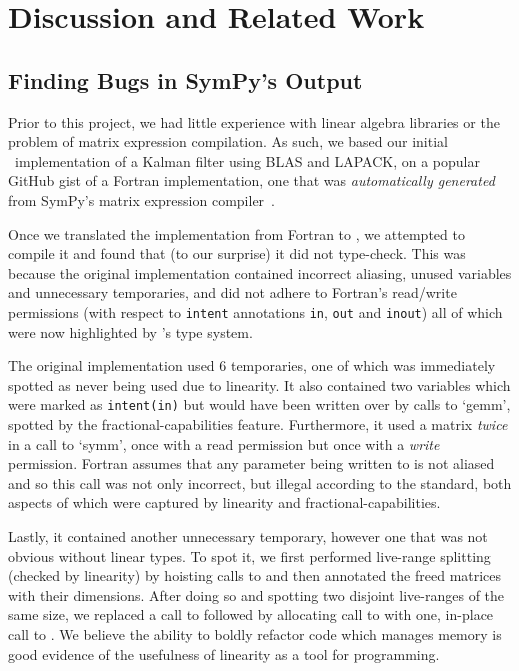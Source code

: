 \section{Discussion and Related Work}\label{sec:discussion_related_work}

\subsection{Finding Bugs in SymPy's Output}

Prior to this project, we had little experience with linear algebra libraries
or the problem of matrix expression compilation. As such, we based our initial
\lang\ implementation of a Kalman filter using BLAS and LAPACK, on a popular
GitHub gist of a Fortran implementation, one that was \emph{automatically
generated} from SymPy's matrix expression compiler~\cite{rocklin_thesis}.

Once we translated the implementation from Fortran to \lang, we attempted to
compile it and found that (to our surprise) it did not type-check. This was
because the original implementation contained incorrect aliasing, unused
variables and unnecessary temporaries, and did not adhere to Fortran's
read/write permissions (with respect to \texttt{intent} annotations
\texttt{in}, \texttt{out} and \texttt{inout}) all of which were now highlighted
by \lang's type system.

The original implementation used 6 temporaries, one of which was immediately
spotted as never being used due to linearity. It also contained two variables
which were marked as \texttt{intent(in)} but would have been written over by
calls to `gemm', spotted by the fractional-capabilities feature. Furthermore,
it used a matrix \emph{twice} in a call to `symm', once with a read permission
but once with a \emph{write} permission.  Fortran assumes that any parameter
being written to is not aliased and so this call was not only incorrect, but
illegal according to the standard, both aspects of which were captured by
linearity and fractional-capabilities.

Lastly, it contained another unnecessary temporary, however one that was not
obvious without linear types. To spot it, we first performed live-range
splitting (checked by linearity) by hoisting calls to  and then
annotated the freed matrices with their dimensions.  After doing so and
spotting two disjoint live-ranges of the same size, we replaced a call to
 followed by allocating call to  with one, in-place
call to . We believe the ability to boldly refactor code which
manages memory is good evidence of the usefulness of linearity as a tool for
programming.

